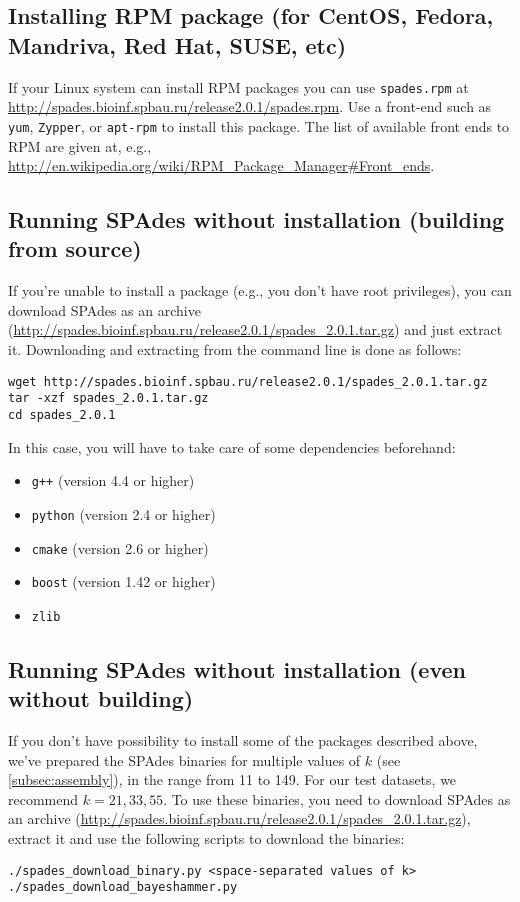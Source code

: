 \documentclass{article}
\def\spades{SPAdes}
\begin{document}
\subsection{Installing RPM package (for CentOS, Fedora, Mandriva, Red Hat, SUSE, etc)}\label{subsec:rpm_package}
If your Linux system can install RPM packages you can use {\tt spades.rpm}
at \url{http://spades.bioinf.spbau.ru/release2.0.1/spades.rpm}. Use a front-end
such as {\tt yum}, {\tt Zypper}, or {\tt apt-rpm} to install this package.
The list of available front ends to RPM are given at, e.g.,
\url{http://en.wikipedia.org/wiki/RPM_Package_Manager#Front_ends}.

\subsection{Running {\spades} without installation (building from source)}\label{subsec:archive}
If you're unable to install a package (e.g., you don't have root privileges),
you can download {\spades} as an archive (\url{http://spades.bioinf.spbau.ru/release2.0.1/spades_2.0.1.tar.gz}) and just extract it.
Downloading and extracting from the command line is done as follows:
\begin{lstlisting}
wget http://spades.bioinf.spbau.ru/release2.0.1/spades_2.0.1.tar.gz
tar -xzf spades_2.0.1.tar.gz
cd spades_2.0.1
\end{lstlisting}
In this case, you will have to take care of some dependencies beforehand:
\begin{itemize}
\item {\tt g++} (version 4.4 or higher)
\item {\tt python} (version 2.4 or higher)
\item {\tt cmake} (version 2.6 or higher)
\item {\tt boost} (version 1.42 or higher)
\item {\tt zlib}
\end{itemize}

\subsection{Running {\spades} without installation (even without building)}\label{subsec:binaries}

If you don't have possibility to install some of the packages described above,
we've prepared the {\spades} binaries for multiple values of $k$ (see 
\cref{subsec:assembly}),
in the range from 11 to 149. For our test datasets, we recommend $k = 21, 33, 55$.
To use these binaries, you need to download {\spades} as an archive (\url{http://spades.bioinf.spbau.ru/release2.0.1/spades_2.0.1.tar.gz}),
extract it and use the following scripts to download the binaries:
\begin{lstlisting}
./spades_download_binary.py <space-separated values of k>
./spades_download_bayeshammer.py
\end{lstlisting}
\end{document}
